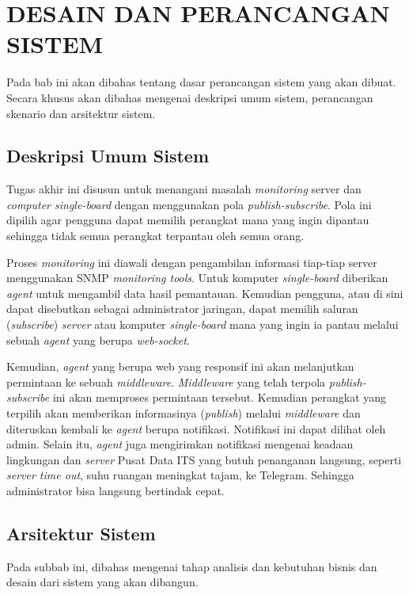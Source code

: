 \chapter{DESAIN DAN PERANCANGAN SISTEM}
\label{chapter:desain}

Pada bab ini akan dibahas tentang dasar perancangan sistem yang akan dibuat. Secara khusus akan dibahas mengenai deskripsi umum sistem, perancangan skenario dan arsitektur
sistem.

\section{Deskripsi Umum Sistem}
Tugas akhir ini disusun untuk menangani masalah \textit{monitoring} server dan \textit{computer single-board} dengan menggunakan pola \textit{publish-subscribe}. Pola ini dipilih agar pengguna dapat memilih perangkat mana yang ingin dipantau sehingga tidak semua perangkat terpantau oleh semua orang.

Proses \textit{monitoring} ini diawali dengan pengambilan informasi tiap-tiap server menggunakan SNMP \textit{monitoring tools}. Untuk komputer \textit{single-board} diberikan \textit{agent} untuk mengambil data hasil pemantauan. Kemudian pengguna, atau di sini dapat disebutkan sebagai administrator jaringan, dapat memilih saluran (\textit{subscribe}) \textit{server} atau komputer \textit{single-board} mana yang ingin ia pantau melalui sebuah \textit{agent} yang berupa \textit{web-socket}.

Kemudian, \textit{agent} yang berupa web yang responsif ini akan melanjutkan permintaan ke sebuah \textit{middleware}. \textit{Middleware} yang telah terpola \textit{publish-subscribe} ini akan memproses permintaan tersebut. Kemudian perangkat yang terpilih akan memberikan informasinya (\textit{publish}) melalui \textit{middleware} dan diteruskan kembali ke \textit{agent} berupa notifikasi. Notifikasi ini dapat dilihat oleh admin. Selain itu, \textit{agent} juga mengirimkan notifikasi mengenai keadaan lingkungan dan \textit{server} Pusat Data ITS yang butuh penanganan langsung, seperti \textit{server time out}, suhu ruangan meningkat tajam, ke Telegram. Sehingga administrator bisa langsung bertindak cepat.


\section{Arsitektur Sistem}
Pada subbab ini, dibahas mengenai tahap analisis dan kebutuhan bisnis dan desain dari sistem yang akan dibangun.

